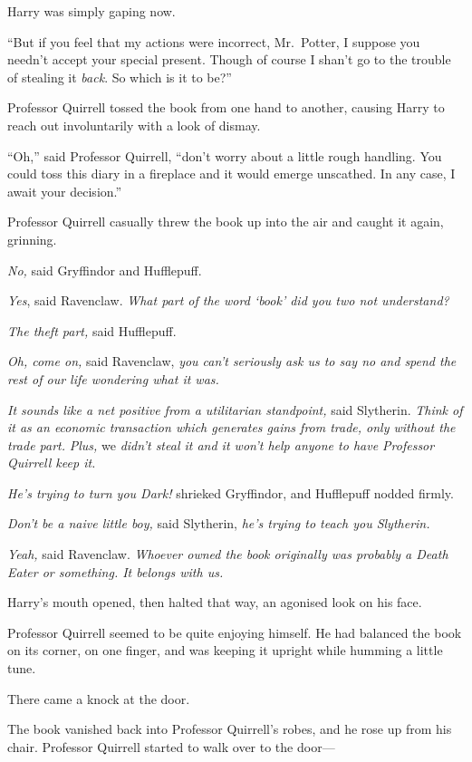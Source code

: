 Harry was simply gaping now.

``But if you feel that my actions were incorrect, Mr.~Potter, I suppose
you needn't accept your special present. Though of course I shan't go to
the trouble of stealing it \emph{back}. So which is it to be?''

Professor Quirrell tossed the book from one hand to another, causing
Harry to reach out involuntarily with a look of dismay.

``Oh,'' said Professor Quirrell, ``don't worry about a little rough
handling. You could toss this diary in a fireplace and it would emerge
unscathed. In any case, I await your decision.''

Professor Quirrell casually threw the book up into the air and caught it
again, grinning.

\emph{No,} said Gryffindor and Hufflepuff.

\emph{Yes}, said Ravenclaw. \emph{What part of the word `book' did you
two not understand?}

\emph{The theft part,} said Hufflepuff.

\emph{Oh, come on,} said Ravenclaw, \emph{you can't seriously ask us to
say no and spend the rest of our life wondering what it was.}

\emph{It sounds like a net positive from a utilitarian standpoint,} said
Slytherin. \emph{Think of it as an economic transaction which generates
gains from trade, only without the trade part.} \emph{Plus,} we
\emph{didn't steal it and it won't help anyone to have Professor
Quirrell keep it.}

\emph{He's trying to turn you Dark!} shrieked Gryffindor, and Hufflepuff
nodded firmly.

\emph{Don't be a naive little boy,} said Slytherin, \emph{he's trying to
teach you Slytherin.}

\emph{Yeah,} said Ravenclaw. \emph{Whoever owned the book originally was
probably a Death Eater or something. It belongs with us.}

Harry's mouth opened, then halted that way, an agonised look on his
face.

Professor Quirrell seemed to be quite enjoying himself. He had balanced
the book on its corner, on one finger, and was keeping it upright while
humming a little tune.

There came a knock at the door.

The book vanished back into Professor Quirrell's robes, and he rose up
from his chair. Professor Quirrell started to walk over to the door---

